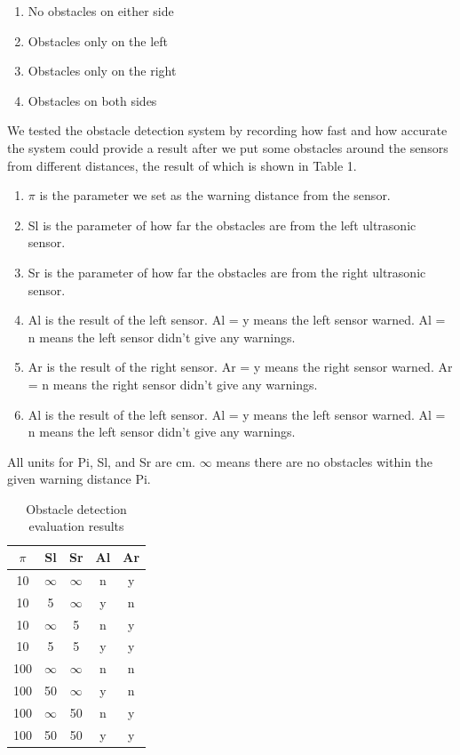 \begin{enumerate}
  \item No obstacles on either side
  \item Obstacles only on the left
  \item Obstacles only on the right
  \item Obstacles on both sides
\end{enumerate}

We tested the obstacle detection system by recording how fast and how accurate the system could provide a result after we put some obstacles around the sensors from different distances, the result of which is shown in Table 1.

\begin{enumerate}
  \item $\pi$ is the parameter we set as the warning distance from the sensor.
  \item Sl is the parameter of how far the obstacles are from the left ultrasonic sensor.
  \item Sr is the parameter of how far the obstacles are from the right ultrasonic sensor.
  \item Al is the result of the left sensor. Al = y means the left sensor warned. Al = n means the left sensor didn’t give any warnings.
  \item Ar is the result of the right sensor. Ar = y means the right sensor warned. Ar = n means the right sensor didn’t give any warnings.
  \item Al is the result of the left sensor. Al = y means the left sensor warned. Al = n means the left sensor didn’t give any warnings.
\end{enumerate}

All units for Pi, Sl, and Sr are cm. $\infty$ means there are no obstacles within the given warning distance Pi.

\begin{table}
  \caption{Obstacle detection evaluation results}
  \label{tab:freq}
  \begin{tabular}{ccccc}
    \toprule
    $\pi$ & Sl & Sr & Al & Ar \\
    \midrule
    10 & $\infty$ & $\infty$ & n & y  \\
    10 & 5 & $\infty$ & y & n  \\
    10 & $\infty$ & 5 & n & y  \\
    10 & 5 & 5 & y & y  \\
    100 & $\infty$ & $\infty$ & n & n  \\
    100 & 50 & $\infty$ & y & n  \\
    100 & $\infty$ & 50 & n & y  \\
    100 & 50 & 50 & y & y  \\
  \bottomrule
\end{tabular}
\end{table}

